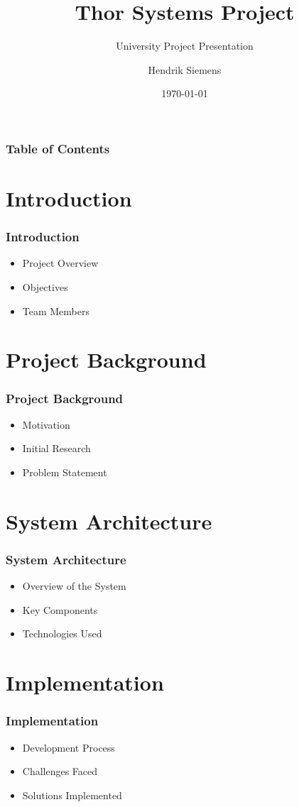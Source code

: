 \documentclass{beamer}
\title{Thor Systems Project}
\subtitle{University Project Presentation}
\author{Hendrik Siemens}
\date{\today}
\begin{document}
\begin{frame}
    \titlepage
\end{frame}

\begin{frame}
    \frametitle{Table of Contents}
    \tableofcontents
\end{frame}


\section{Introduction}
\begin{frame}
    \frametitle{Introduction}
    \begin{itemize}
        \item Project Overview
        \item Objectives
        \item Team Members
    \end{itemize}
\end{frame}

\section{Project Background}
\begin{frame}
    \frametitle{Project Background}
    \begin{itemize}
        \item Motivation
        \item Initial Research
        \item Problem Statement
    \end{itemize}
\end{frame}

\section{System Architecture}
\begin{frame}
    \frametitle{System Architecture}
    \begin{itemize}
        \item Overview of the System
        \item Key Components
        \item Technologies Used
    \end{itemize}
\end{frame}

\section{Implementation}
\begin{frame}
    \frametitle{Implementation}
    \begin{itemize}
        \item Development Process
        \item Challenges Faced
        \item Solutions Implemented
    \end{itemize}
\end{frame}
\end{document}
